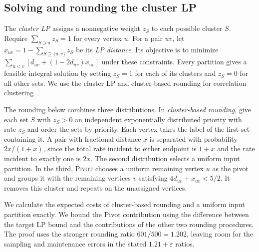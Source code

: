 \documentclass[11pt]{article}
\newcommand{\Pivot}{\textsc{Pivot}}
\begin{document}
\subsection{Solving and rounding the cluster LP}

The \emph{cluster LP} assigns a nonnegative weight $z_S$ to each possible
cluster $S$.
Require $\sum_{S\ni u}z_S=1$ for every vertex $u$. For a pair $uv$,
let $x_{uv}=1-\sum_{S\supseteq\{u,v\}}z_S$ be its \emph{LP distance}. Its objective is to minimize
$\sum_{u<v}[d_{uv}+(1-2d_{uv})x_{uv}]$ under these constraints.
Every partition gives a feasible integral solution by setting $z_S=1$
for each of its clusters and $z_S=0$ for all other sets. We use the
cluster LP and cluster-based rounding for correlation
clustering~\cite{CCLLNV2024,clusterLP25}.

The rounding below combines three distributions. In \emph{cluster-based rounding},
give each set $S$ with $z_S>0$ an independent exponentially
distributed priority with rate $z_S$ and order the sets by priority. Each vertex takes
the label of the first set containing it. A pair with fractional distance $x$ is
separated with
probability $2x/(1+x)$, since the total rate incident to either
endpoint is $1+x$ and the rate incident to exactly one is $2x$.
The second distribution selects a uniform input partition. In the
third, \Pivot{} chooses a uniform remaining vertex $u$ as the pivot
and groups it with the remaining vertices $v$ satisfying
$4d_{uv}+x_{uv}<5/2$. It removes this cluster and repeats on the
unassigned vertices.

We calculate the expected costs of cluster-based rounding and a
uniform input partition exactly.
We bound the Pivot contribution using the difference between the target
LP bound and the contributions of the other two rounding procedures. The proof uses the
stronger rounding ratio $601/500=1.202$, leaving room for the sampling
and maintenance errors in the stated $1.21+\varepsilon$ ratios.
\end{document}
